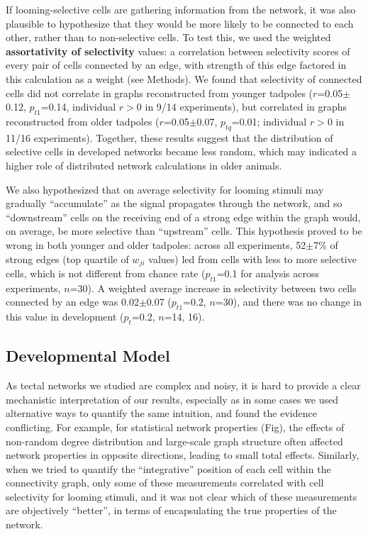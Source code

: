 \documentclass{article}
\begin{document}
If looming-selective cells are gathering information from the network, it was also plausible to hypothesize that they would be more likely to be connected to each other, rather than to non-selective cells. To test this, we used the weighted \textbf{assortativity of selectivity} values: a correlation between selectivity scores of every pair of cells connected by an edge, with strength of this edge factored in this calculation as a weight (see Methods). We found that selectivity of connected cells did not correlate in graphs reconstructed from younger tadpoles ($r$=0.05$\pm$0.12, $p_{t1}$=0.14, individual $r>$0 in 9/14 experiments), but correlated in graphs reconstructed from older tadpoles ($r$=0.05$\pm$0.07, $p_{tq}$=0.01; individual $r>$0 in 11/16 experiments). Together, these results suggest that the distribution of selective cells in developed networks became less random, which may indicated a higher role of distributed network calculations in older animals.

We also hypothesized that on average selectivity for looming stimuli may gradually “accumulate” as the signal propagates through the network, and so “downstream” cells on the receiving end of a strong edge within the graph would, on average, be more selective than “upstream” cells. This hypothesis proved to be wrong in both younger and older tadpoles: across all experiments, 52$\pm$7\% of strong edges (top quartile of $w_{ji}$ values) led from cells with less to more selective cells, which is not different from chance rate ($p_{t1}$=0.1 for analysis across experiments, $n$=30). A weighted average increase in selectivity between two cells connected by an edge was 0.02$\pm$0.07 ($p_{t1}$=0.2, $n$=30), and there was no change in this value in development ($p_t$=0.2, $n$=14, 16).

\subsection*{Developmental Model}

As tectal networks we studied are complex and noisy, it is hard to provide a clear mechanistic interpretation of our results, especially as in some cases we used alternative ways to quantify the same intuition, and found the evidence conflicting. For example, for statistical network properties (Fig), the effects of non-random degree distribution and large-scale graph structure often affected network properties in opposite directions, leading to small total effects. Similarly, when we tried to quantify the “integrative” position of each cell within the connectivity graph, only some of these measurements correlated with cell selectivity for looming stimuli, and it was not clear which of these measurements are objectively “better”, in terms of encapsulating the true properties of the network.
\end{document}
